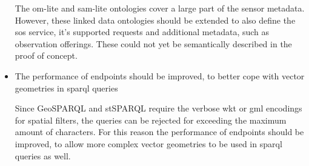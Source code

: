 \begin{itemize}
	The om-lite and sam-lite ontologies cover a large part of the sensor metadata. However, these linked data ontologies should be extended to also define the \ac{sos} service, it's supported requests and additional metadata, such as observation offerings. These could not yet be semantically described in the proof of concept.
	
	
	\item The performance of endpoints should be improved, to better cope with vector geometries in \ac{sparql} queries
	
	Since GeoSPARQL and stSPARQL require the verbose \ac{wkt} or \ac{gml} encodings for spatial filters, the queries can be rejected for exceeding the maximum amount of characters. For this reason the performance of endpoints should be improved, to allow more complex vector geometries to be used in \ac{sparql} queries as well. 
	
\end{itemize}




